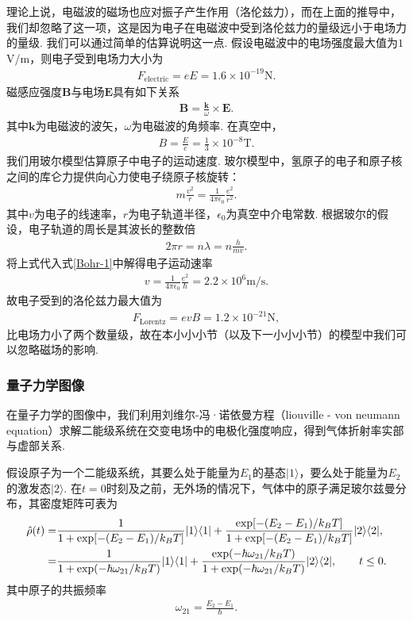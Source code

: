 \documentclass[a4paper, 10pt]{article}
\begin{document}
\begin{multicols*}{2}
理论上说，电磁波的磁场也应对振子产生作用（洛伦兹力），而在上面的推导中，我们却忽略了这一项，这是因为电子在电磁波中受到洛伦兹力的量级远小于电场力的量级. 我们可以通过简单的估算说明这一点. 假设电磁波中的电场强度最大值为$1$V/m，则电子受到电场力大小为
\begin{align}
    F_{\text{electric}}=eE=1.6\times 10^{-19}\text{N}.
\end{align}
磁感应强度$\bm{B}$与电场$\bm{E}$具有如下关系
\begin{align}
    \bm{B}=\frac{\bm{k}}{\omega}\times\bm{E}.
\end{align}
其中$\bm{k}$为电磁波的波矢，$\omega$为电磁波的角频率.
在真空中，
\begin{align}
    B=\frac{E}{c}=\frac{1}{3}\times 10^{-8}\text{T}.
\end{align}
我们用玻尔模型估算原子中电子的运动速度. 玻尔模型中，氢原子的电子和原子核之间的库仑力提供向心力使电子绕原子核旋转：
\begin{align}
    \label{Bohr-1}
    m\frac{v^2}{r}=\frac{1}{4\pi\epsilon_0}\frac{e^2}{r^2}.
\end{align}
其中$v$为电子的线速率，$r$为电子轨道半径，$\epsilon_0$为真空中介电常数. 根据玻尔的假设，电子轨道的周长是其波长的整数倍
\begin{align}
    2\pi r=n\lambda=n\frac{h}{mv}.
\end{align}
将上式代入式\eqref{Bohr-1}中解得电子运动速率
\begin{align}
    v=\frac{1}{4\pi\epsilon_0}\frac{e^2}{\hbar}=2.2\times 10^6\text{m/s}.
\end{align}
故电子受到的洛伦兹力最大值为
\begin{align}
    F_{\text{Lorentz}}=evB=1.2\times 10^{-21}\text{N},
\end{align}
比电场力小了两个数量级，故在本小小小节（以及下一小小小节）的模型中我们可以忽略磁场的影响.

\subsubsection{量子力学图像}
在量子力学的图像中，我们利用刘维尔-冯·诺依曼方程（liouville - von neumann equation）求解二能级系统在交变电场中的电极化强度响应，得到气体折射率实部与虚部关系.

假设原子为一个二能级系统，其要么处于能量为$E_1$的基态$\lvert 1\rangle$，要么处于能量为$E_2$的激发态$\lvert 2\rangle$. 在$t=0$时刻及之前，无外场的情况下，气体中的原子满足玻尔兹曼分布，其密度矩阵可表为
\tiny
\begin{align}
    \label{density-matrix-init-value}
    \notag\hat{\rho}(t)=&\frac{1}{1+\exp[-(E_2-E_1)/k_BT]}\lvert 1\rangle\langle 1\rvert+\frac{\exp[-(E_2-E_1)/k_BT]}{1+\exp[-(E_2-E_1)/k_BT]}\lvert 2\rangle\langle 2\rvert,\\
    =&\frac{1}{1+\exp(-\hbar\omega_{21}/k_BT)}\lvert 1\rangle\langle 1\rvert+\frac{\exp(-\hbar\omega_{21}/k_BT)}{1+\exp(-\hbar\omega_{21}/k_BT)}\lvert 2\rangle\langle 2\rvert,\qquad t\leq 0.
\end{align}
\normalsize
其中原子的共振频率
\begin{align}
    \omega_{21}=\frac{E_2-E_1}{\hbar}.
\end{align}


\end{multicols*}
\end{document}
